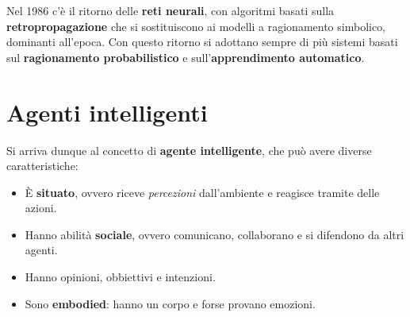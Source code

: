Nel 1986 c'\`e il ritorno delle \textbf{reti neurali}, con algoritmi basati sulla
\textbf{retropropagazione} che si sostituiscono ai modelli a ragionamento simbolico,
dominanti all'epoca. Con questo ritorno si adottano sempre di pi\`u sistemi basati sul
\textbf{ragionamento probabilistico} e sull'\textbf{apprendimento automatico}.

\section{Agenti intelligenti}
Si arriva dunque al concetto di \textbf{agente intelligente}, che pu\`o avere diverse
caratteristiche:
\begin{itemize}
	\item \`E \textbf{situato}, ovvero riceve \emph{percezioni} dall'ambiente e reagisce tramite
	      delle azioni.
	\item Hanno abilit\`a \textbf{sociale}, ovvero comunicano, collaborano e si difendono da
	      altri agenti.
	\item Hanno opinioni, obbiettivi e intenzioni.
	\item Sono \textbf{embodied}: hanno un corpo e forse provano emozioni.
\end{itemize}
